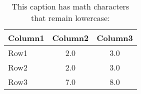 \begin{table}[h] %
\caption{This caption has math characters that remain lowercase: \relax{} }
\label{table\arabic{tablecounter}}
\begin{tabu}{l c c} \\ \hline
Column1 & Column2 & Column3 \\ \hline
Row1 & 2.0 & 3.0 \\
Row2 & 2.0 & 3.0 \\
Row3 & 7.0 & 8.0 \\ \hline
\end{tabu}
\end{table}
